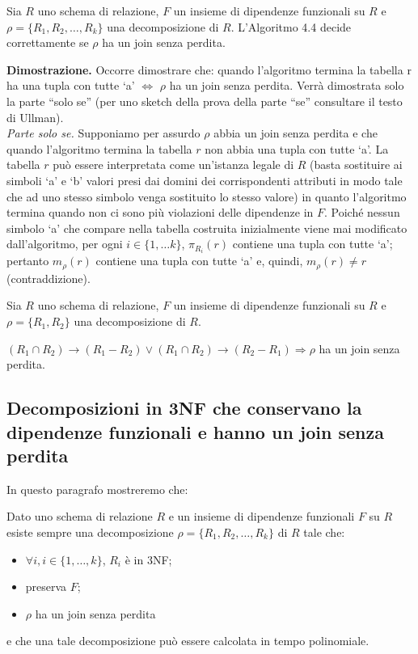 \begin{theo}
Sia $R$ uno schema di relazione, $F$ un insieme di dipendenze funzionali su $R$ e $\rho =\{R_1, R_2, \ldots, R_k\}$
una decomposizione di $R$. L'Algoritmo 4.4 decide correttamente se $\rho$ ha un join senza perdita.
\end{theo}
\textbf{Dimostrazione.} Occorre dimostrare che: quando l'algoritmo termina la tabella r ha una tupla con tutte `a' 
$\Leftrightarrow$ $\rho$ ha un join senza perdita. Verrà dimostrata solo la parte ``solo se'' (per uno sketch della 
prova della parte ``se'' consultare il testo di Ullman).\\
\emph{Parte solo se.} Supponiamo per assurdo $\rho$ abbia un join senza perdita e che quando l'algoritmo
termina la tabella $r$ non abbia una tupla con tutte `a'. La tabella $r$ può essere interpretata come
un'istanza legale di $R$ (basta sostituire ai simboli `a' e `b' valori presi dai domini dei corrispondenti
attributi in modo tale che ad uno stesso simbolo venga sostituito lo stesso valore) in quanto
l'algoritmo termina quando non ci sono più violazioni delle dipendenze in $F$. Poiché nessun
simbolo `a' che compare nella tabella costruita inizialmente viene mai modificato dall'algoritmo,
per ogni $i \in \{1, \ldots k\}$, $\pi_{R_i}(r)$ contiene una tupla con tutte `a'; pertanto $m_\rho(r)$ contiene una 
tupla con tutte `a' e, quindi, $m_\rho(r) \not= r$ (contraddizione).
\begin{cor}
Sia $R$ uno schema di relazione, $F$ un insieme di dipendenze funzionali su $R$ e $\rho = \{R_1, R_2\}$
una decomposizione di $R$.
\begin{center}
$(R_1 \cap R_2) \rightarrow (R_1 - R_2) \vee (R_1 \cap R_2) \rightarrow (R_2 -R_1) \Rightarrow \rho$ ha un join senza 
perdita.                            
\end{center}
\end{cor}

\subsection{Decomposizioni in 3NF che conservano la dipendenze funzionali e hanno un join senza perdita}

In questo paragrafo mostreremo che: 
\begin{prop}
Dato uno schema di relazione $R$ e un insieme di dipendenze funzionali $F$ su $R$ esiste sempre una decomposizione
$\rho = \{R_1, R_2, \ldots, R_k\}$ di $R$ tale che:
\begin{itemize}
 \item $\forall i, i \in \{1, \ldots, k\}$, $R_i$ è in 3NF;
 \item preserva $F$;
 \item $\rho$ ha un join senza perdita
\end{itemize}
e che una tale decomposizione può essere calcolata in tempo polinomiale. 
\end{prop}

